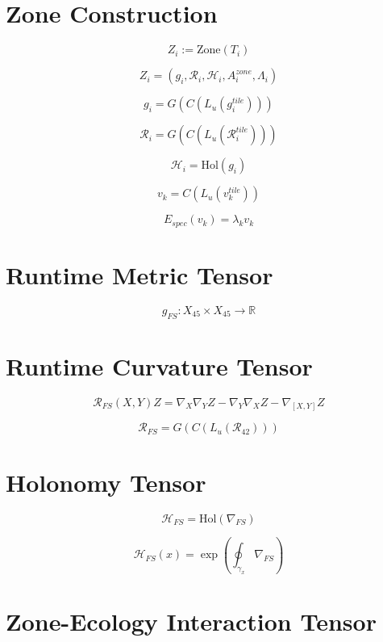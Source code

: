 \section*{Zone Construction}

\[
Z_i := \mathrm{Zone}(T_i)
\]

\[
Z_i = (g_i, \mathcal{R}_i, \mathcal{H}_i, A_i^{zone}, \Lambda_i)
\]

\[
g_i = G(C(L_u(g_i^{tile})))
\]

\[
\mathcal{R}_i = G(C(L_u(\mathcal{R}_i^{tile})))
\]

\[
\mathcal{H}_i = \mathrm{Hol}(g_i)
\]

\[
v_k = C(L_u(v_k^{tile}))
\]

\[
E_{spec}(v_k) = \lambda_k v_k
\]


\section*{Runtime Metric Tensor}

\[
g_{FS} : X_{45} \times X_{45} \to \mathbb{R}
\]


\section*{Runtime Curvature Tensor}

\[
\mathcal{R}_{FS}(X,Y)Z
= \nabla_X \nabla_Y Z
- \nabla_Y \nabla_X Z
- \nabla_{[X,Y]} Z
\]

\[
\mathcal{R}_{FS}
= G(C(L_u(\mathcal{R}_{42})))
\]


\section*{Holonomy Tensor}

\[
\mathcal{H}_{FS}
= \mathrm{Hol}(\nabla_{FS})
\]

\[
\mathcal{H}_{FS}(x)
= \exp\left( \oint_{\gamma_x} \nabla_{FS} \right)
\]


\section*{Zone-Ecology Interaction Tensor}

